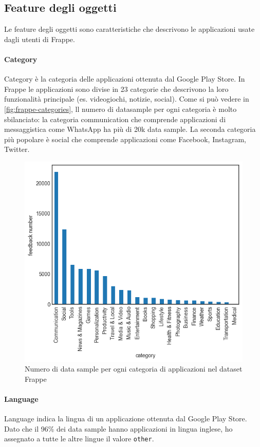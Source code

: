 \documentclass[12pt,italian]{report}
\begin{document}
\subsection{Feature degli oggetti}
Le feature degli oggetti sono caratteristiche che descrivono le applicazioni usate dagli utenti di Frappe.

\paragraph{Category} Category è la categoria delle applicazioni ottenuta dal Google Play Store. In Frappe le applicazioni sono divise in 23 categorie che descrivono la loro funzionalità principale (es. videogiochi, notizie, social). Come si può vedere in \autoref{fig:frappe-categories}, ll numero di datasample per ogni categoria è molto sbilanciato: la categoria communication che comprende applicazioni di messaggistica come WhatsApp ha più di 20k data sample. La seconda categoria più popolare è social che comprende applicazioni come Facebook, Instagram, Twitter.
\begin{figure}
  \centering
  \includegraphics[scale=0.85]{immagini/frappe-category.png}
  \caption{Numero di data sample per ogni categoria di applicazioni nel dataset Frappe}
  \label{fig:frappe-categories}
\end{figure}

\paragraph{Language} Language indica la lingua di un applicazione ottenuta dal Google Play Store. Dato che il 96\% dei data sample hanno applicazioni in lingua inglese, ho assegnato a tutte le altre lingue il valore \texttt{other}.
\end{document}
